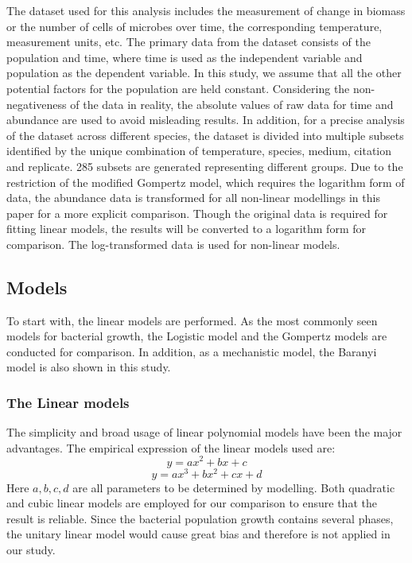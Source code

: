 \documentclass[11pt, oneside]{article}
\begin{document}
		The dataset used for this analysis includes the measurement of change in biomass or the number of cells of microbes over time, the corresponding temperature, measurement units, etc. The primary data from the dataset consists of the population and time, where time is used as the independent variable and population as the dependent variable. In this study, we assume that all the other potential factors for the population are held constant. Considering the non-negativeness of the data in reality, the absolute values of raw data for time and abundance are used to avoid misleading results. In addition, for a precise analysis of the dataset across different species, the dataset is divided into multiple subsets identified by the unique combination of temperature, species, medium, citation and replicate. 285 subsets are generated representing different groups. Due to the restriction of the modified Gompertz model, which requires the logarithm form of data, the abundance data is transformed for all non-linear modellings in this paper for a more explicit comparison. Though the original data is required for fitting linear models, the results will be converted to a logarithm form for comparison. The log-transformed data is used for non-linear models.

 		\subsection{Models}
 
 		To start with, the linear models are performed.  As the most commonly seen models for bacterial growth, the Logistic model and the Gompertz models are conducted for comparison. In addition, as a mechanistic model, the Baranyi model is also shown in this study.
		
			\subsubsection{The Linear models}
			
			The simplicity and broad usage of linear polynomial models have been the major advantages. The empirical expression of the linear models used are:
			\[y = ax^2 + bx + c\]
			\[y = ax^3 + bx^2 + cx + d\]
			\noindent Here \(a, b, c, d\) are all parameters to be determined by modelling. Both quadratic and cubic linear models are employed for our comparison to ensure that the result is reliable. Since the bacterial population growth contains several phases, the unitary linear model would cause great bias and therefore is not applied in our study.
			
\end{document}

